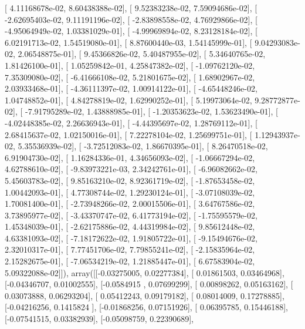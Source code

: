 \documentclass{article}
\begin{document}
       [  4.11168678e-02,   8.60438388e-02],
       [  9.52383238e-02,   7.59094686e-02],
       [ -2.62695403e-02,   9.11191196e-02],
       [ -2.83898558e-02,   4.76929866e-02],
       [ -4.95064949e-02,   1.03381029e-01],
       [ -4.99969894e-02,   8.23128184e-02],
       [  6.02191713e-02,   1.54519080e-01],
       [  8.87600440e-03,   1.54145999e-01],
       [  9.04293083e-02,   2.06548875e-01],
       [  9.45366826e-02,   5.40487955e-02],
       [  5.34640765e-02,   1.81426100e-01],
       [  1.05259842e-01,   4.25847382e-02],
       [ -1.09762120e-02,   7.35309080e-02],
       [ -6.41666108e-02,   5.21801675e-02],
       [  1.68902967e-02,   2.03933468e-01],
       [ -4.36111397e-02,   1.00914122e-01],
       [ -4.65448246e-02,   1.04748852e-01],
       [  4.84278819e-02,   1.62990252e-01],
       [  5.19973064e-02,   9.28772877e-02],
       [ -7.91795289e-02,   1.43888985e-01],
       [ -1.20353623e-02,   1.53623490e-01],
       [ -4.02448385e-02,   2.26636943e-01],
       [ -4.44395697e-02,   1.28769112e-01],
       [  2.68415637e-02,   1.02150016e-01],
       [  7.22278104e-02,   1.25699751e-01],
       [  1.12943937e-02,   5.35536939e-02],
       [ -3.72512083e-02,   1.86670395e-01],
       [  8.26470518e-02,   6.91904730e-02],
       [  1.16284336e-01,   4.34656093e-02],
       [ -1.06667294e-02,   4.62788610e-02],
       [ -9.83973221e-03,   2.34242761e-01],
       [ -6.96082662e-02,   5.45603783e-02],
       [  9.85163210e-02,   8.92361719e-02],
       [ -1.87653458e-02,   1.00442093e-01],
       [  4.77308744e-02,   1.29230124e-01],
       [ -3.07108039e-02,   1.70081400e-01],
       [ -2.73948266e-02,   2.00015506e-01],
       [  3.64767586e-02,   3.73895977e-02],
       [ -3.43370747e-02,   6.41773194e-02],
       [ -1.75595579e-02,   1.45348039e-01],
       [ -2.62175886e-02,   4.44319984e-02],
       [  9.85612448e-02,   4.63381093e-02],
       [ -7.18172622e-02,   1.91805722e-01],
       [ -9.15494676e-02,   2.32010317e-01],
       [  7.77451706e-02,   7.79855241e-02],
       [ -2.15835964e-02,   2.15282675e-01],
       [ -7.06534219e-02,   1.21885447e-01],
       [  6.67583904e-02,   5.09322088e-02]]), array([[-0.03275005,  0.02277384],
       [ 0.01861503,  0.03464968],
       [-0.04346707,  0.01002555],
       [-0.0584915 ,  0.07699299],
       [ 0.00898262,  0.05163162],
       [ 0.03073888,  0.06293204],
       [ 0.05412243,  0.09179182],
       [ 0.08014009,  0.17278885],
       [-0.04216256,  0.1415824 ],
       [-0.01868256,  0.07151926],
       [ 0.06395785,  0.15446188],
       [-0.07541515,  0.03382939],
       [-0.05098759,  0.22390689],
\end{document}
